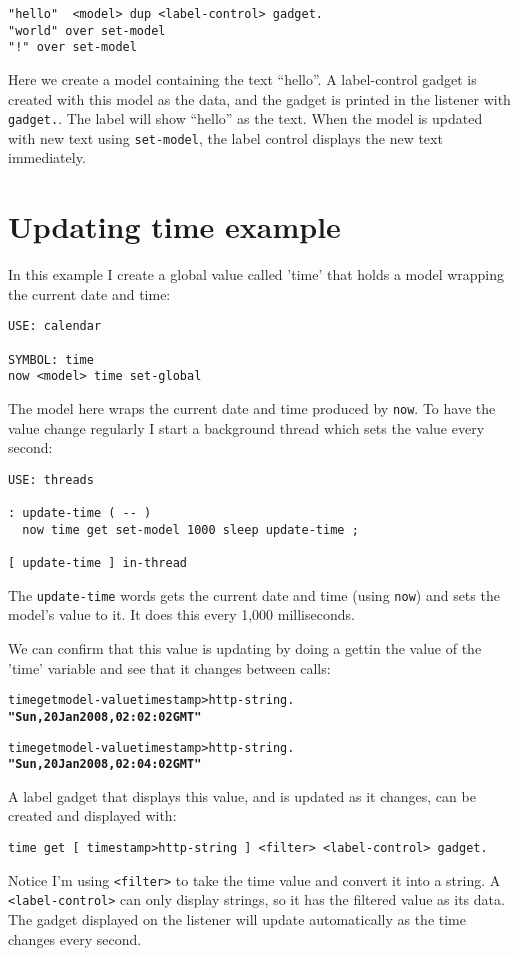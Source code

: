 \begin{verbatim}
"hello"  <model> dup <label-control> gadget.
"world" over set-model
"!" over set-model
\end{verbatim}

Here we create a model containing the text ``hello''. A label-control gadget is created with this model as the data, and the gadget is printed in the listener with \verb|gadget.|. The label will show ``hello'' as the text. When the model is updated with new text using \verb|set-model|, the label control displays the new text immediately.

\section{Updating time example}

In this example I create a global value called 'time' that holds a
model wrapping the current date and time:

\begin{verbatim}
USE: calendar

SYMBOL: time
now <model> time set-global
\end{verbatim}

The model here wraps the current date and time produced by
\verb|now|. To have the value change regularly I start a background
thread which sets the value every second:

\begin{verbatim}
USE: threads

: update-time ( -- )
  now time get set-model 1000 sleep update-time ;

[ update-time ] in-thread
\end{verbatim}

The \verb|update-time| words gets the current date and time (using \verb|now|)
and sets the model's value to it. It does this every 1,000
milliseconds.

We can confirm that this value is updating by doing a gettin the value of
the 'time' variable and see that it changes between calls:

\begin{alltt}
time get model-value timestamp>http-string .
  \textbf{"Sun, 20 Jan 2008, 02:02:02 GMT"} 

time get model-value timestamp>http-string .
  \textbf{"Sun, 20 Jan 2008, 02:04:02 GMT" }
\end{alltt}

A label gadget that displays this value, and is updated as it changes,
can be created and displayed with:

\begin{verbatim}
time get [ timestamp>http-string ] <filter> <label-control> gadget.
\end{verbatim}

Notice I'm using \verb|<filter>| to take the time value and convert it into a string. A \verb|<label-control>| can only display strings, so it has the filtered value as its data. The gadget displayed on the listener will update automatically as the time changes every second.

